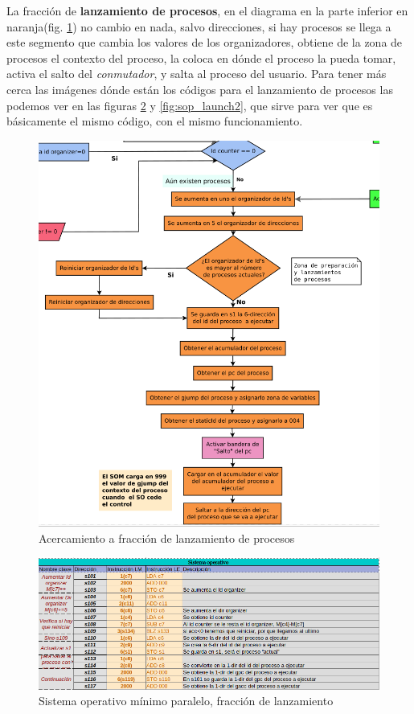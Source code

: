 \documentclass[letterpaper,12pt,oneside]{book}
\begin{document}
			
			La fracción de \textbf{lanzamiento de procesos}, en el diagrama en la parte inferior en naranja(fig. \ref{fig:diag_somp_launch_process}) no cambio en nada, 
			salvo direcciones, si hay procesos
			se llega a este segmento que cambia los valores de los organizadores, obtiene de la zona de procesos el contexto del proceso,
			la coloca en dónde el proceso la pueda tomar, activa el salto del \textit{conmutador}, y salta al proceso del usuario. Para tener más cerca las imágenes
			dónde están los códigos para el lanzamiento de procesos las podemos ver en las figuras \ref{fig:sop_launch} y \ref{fig:sop_launch2}, que sirve
			para ver que es básicamente el mismo código, con el mismo funcionamiento.
			
		
			\begin{figure}[H]		
				\centering
				\includegraphics[scale=0.45]{media/Paralela/diag_somp_launch_process.png}
				\caption{Acercamiento a fracción de lanzamiento de procesos}
				\label{fig:diag_somp_launch_process}
			\end{figure}	
			
			
			\begin{figure}[H]		
				\centering
				\includegraphics[scale=0.53]{media/Paralela/sop_launch1.png}
				\caption{Sistema operativo mínimo paralelo, fracción de lanzamiento}
				\label{fig:sop_launch}
			\end{figure}	
			
\end{document}
